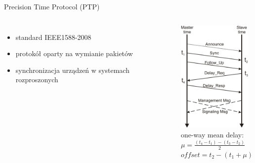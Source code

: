\documentclass[compress,red]{beamer}
\begin{document}
\begin{frame}{Precision Time Protocol (PTP)}
\begin{columns}[c]
\column{2.8in}

  \begin{itemize}
    \item standard IEEE1588-2008
    \item protokół oparty na wymianie pakietów
    \item synchronizacja urządzeń w systemach rozproszonych
  \end{itemize}

\column{1.5in}
    \includegraphics[height=5.5cm]{protocol/ptpMSGs.pdf} \\
    \small 
    one-way mean delay: \\
    $\mu = \frac{(t_{4}-t_{1}) - (t_{3}-t_{2})}{2}$ \\
    \small 
    $offset = t_{2} - (t_{1} + \mu)$
    
\end{columns}


\end{frame}
\end{document}
